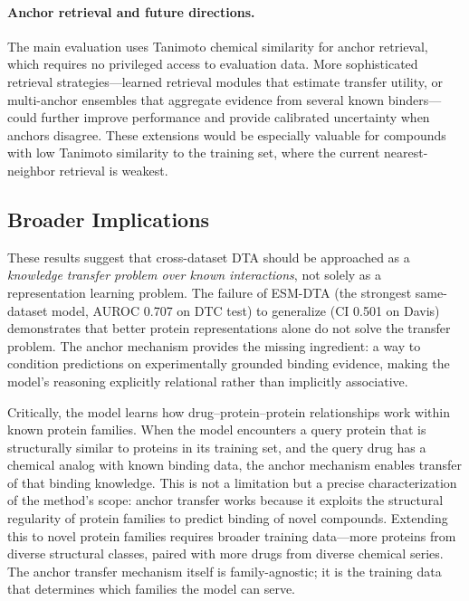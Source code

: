\paragraph{Anchor retrieval and future directions.}
The main evaluation uses Tanimoto chemical similarity for anchor retrieval, which requires no privileged access to evaluation data. More sophisticated retrieval strategies---learned retrieval modules that estimate transfer utility, or multi-anchor ensembles that aggregate evidence from several known binders---could further improve performance and provide calibrated uncertainty when anchors disagree. These extensions would be especially valuable for compounds with low Tanimoto similarity to the training set, where the current nearest-neighbor retrieval is weakest.

\subsection{Broader Implications}

These results suggest that cross-dataset DTA should be approached as a \emph{knowledge transfer problem over known interactions}, not solely as a representation learning problem. The failure of ESM-DTA (the strongest same-dataset model, AUROC 0.707 on DTC test) to generalize (CI 0.501 on Davis) demonstrates that better protein representations alone do not solve the transfer problem. The anchor mechanism provides the missing ingredient: a way to condition predictions on experimentally grounded binding evidence, making the model's reasoning explicitly relational rather than implicitly associative.

Critically, the model learns how drug--protein--protein relationships work within known protein families. When the model encounters a query protein that is structurally similar to proteins in its training set, and the query drug has a chemical analog with known binding data, the anchor mechanism enables transfer of that binding knowledge. This is not a limitation but a precise characterization of the method's scope: anchor transfer works because it exploits the structural regularity of protein families to predict binding of novel compounds. Extending this to novel protein families requires broader training data---more proteins from diverse structural classes, paired with more drugs from diverse chemical series. The anchor transfer mechanism itself is family-agnostic; it is the training data that determines which families the model can serve.
